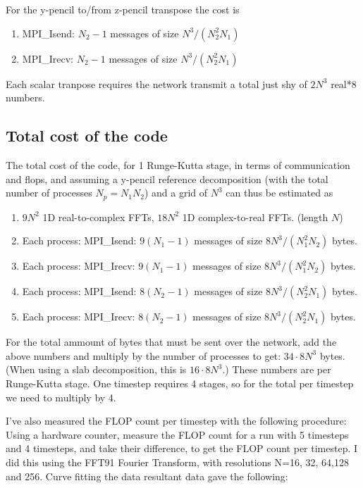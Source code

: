 \documentclass[12pt]{article}
\begin{document}
For the y-pencil to/from z-pencil transpose the cost is
\begin{enumerate}
\item MPI\_Isend:  $N_2 -1$ messages of size $N^3/(N_2^2 N_1)$
\item MPI\_Irecv:  $N_2 -1$ messages of size $N^3/(N_2^2 N_1)$
\end{enumerate}


Each scalar tranpose requires the network transmit a total just
shy of $2N^3$ real*8 numbers.  


\subsection{Total cost of the code}

The total cost of the code, for 1 Runge-Kutta stage,
in terms of communication and flops,
and assuming a y-pencil reference decomposition 
(with the total number of processes $N_p = N_1 N_2$) and a grid of $N^3$
can thus be estimated as

\begin{enumerate}
\item $9N^2$ 1D real-to-complex FFTs, $18N^2$ 1D complex-to-real FFTs.  (length $N$)
\item Each process: MPI\_Isend:  $9(N_1 -1)$ messages of size $8N^3/(N_1^2 N_2)$ bytes.
\item Each process: MPI\_Irecv:  $9(N_1 -1)$ messages of size $8N^3/(N_1^2 N_2)$ bytes.
\item Each process: MPI\_Isend:  $8(N_2 -1)$ messages of size $8N^3/(N_2^2 N_1)$ bytes.
\item Each process: MPI\_Irecv:  $8(N_2 -1)$ messages of size $8N^3/(N_2^2 N_1)$ bytes.
\end{enumerate}

For the total ammount of bytes that must be sent over the network, add
the above numbers and multiply by the number of processes to get: $34
\cdot 8 N^3$ bytes.  (When using a slab decomposition, this is $16
\cdot 8 N^3$.)  These numbers are per Runge-Kutta stage.  One timestep
requires 4 stages, so for the total per timestep we need to multiply
by 4.

I've also measured the FLOP count per timestep with the following
procedure:  Using a hardware counter, measure the FLOP count
for a run with 5 timesteps and 4 timesteps, and take their
difference, to get the FLOP count per timestep.  
I did this using the FFT91 Fourier Transform, with resolutions
N=16, 32, 64,128 and 256.  Curve fitting the data resultant data
gave the following:  
\end{document}
